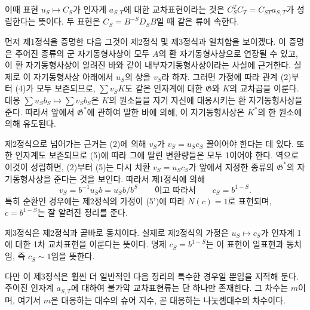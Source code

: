 이때 표현 \(u_S\mapsto C_S\)가 인자계 \(a_{S,T}\)에 대한 교차표현이라는 것은 \(C_S^TC_T=C_{ST}a_{S,T}\)가 성립한다는 뜻이다. 두 표현은 \(C_S=B^{-S}D_SB\)일 때 같은 류에 속한다.

먼저 제1정식을 증명한 다음 그것이 제2정식 및 제3정식과 일치함을 보이겠다. 이 증명은 주어진 종류의 군 자기동형사상이 모두 \(A\)의 환 자기동형사상으로 연장될 수 있고, 이 환 자기동형사상이 알려진 바와 같이 내부자기동형사상이라는 사실에 근거한다. 실제로 이 자기동형사상 아래에서 \(u_S\)의 상을 \(v_S\)라 하자. 그러면 가정에 따라 관계 (2)부터 (4)가 모두 보존되므로, \(\sum v_SK\)도 같은 인자계에 대한 \(\mathfrak G\)와 \(K\)의 교차곱을 이룬다. 대응 \(\sum u_Sb_S\mapsto\sum v_Sb_S\)은 \(K\)의 원소들을 자기 자신에 대응시키는 환 자기동형사상을 준다. 따라서 앞에서 \(\mathfrak G^*\)에 관하여 말한 바에 의해, 이 자기동형사상은 \(K^*\)의 한 원소에 의해 유도된다.

제2정식으로 넘어가는 근거는 (2)에 의해 \(v_S\)가 \(v_S=u_Sc_S\) 꼴이어야 한다는 데 있다. 또한 인자계도 보존되므로 (5)에 따라 그에 딸린 변환량들은 모두 1이어야 한다. 역으로 이것이 성립하면, (2)부터 (5)는 다시 치환 \(v_S=u_Sc_S\)가 앞에서 지정한 종류의 \(\mathfrak G^*\)의 자기동형사상을 준다는 것을 보인다. 따라서 제1정식에 의해
\[
v_S=b^{-1}u_Sb=u_Sb/b^S\qquad\text{이고 따라서}\qquad c_S=b^{1-S}.
\]
특히 순환인 경우에는 제2정식의 가정이 (5')에 따라 \(N(c)=1\)로 표현되며, \(c=b^{1-S}\)는 잘 알려진 정리를 준다.

제3정식은 제2정식과 곧바로 동치이다. 실제로 제2정식의 가정은 \(u_S\mapsto c_S\)가 인자계 1에 대한 1차 교차표현을 이룬다는 뜻이다. 명제 \(c_S=b^{1-S}\)는 이 표현이 일표현과 동치임, 즉 \(c_S\sim1\)임을 뜻한다.

다만 이 제3정식은 훨씬 더 일반적인 다음 정리의 특수한 경우일 뿐임을 지적해 둔다. 주어진 인자계 \(a_{S,T}\)에 대하여 불가약 교차표현류는 단 하나만 존재한다. 그 차수는 \(m\)이며, 여기서 \(m\)은 대응하는 대수의 슈어 지수, 곧 대응하는 나눗셈대수의 차수이다.

